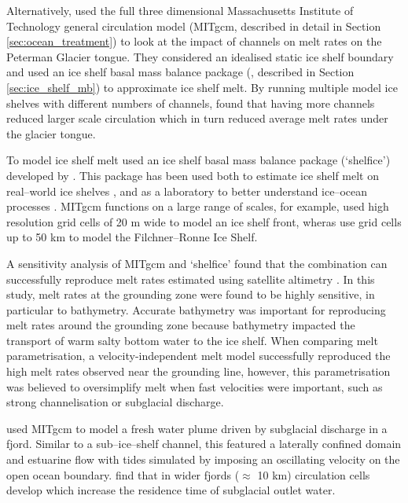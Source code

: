 Alternatively, \cite{millgate2013effect} used the full three dimensional Massachusetts Institute of Technology general circulation model (MITgcm, described in detail in Section \ref{sec:ocean_treatment}) to look at the impact of channels on melt rates on the Peterman Glacier tongue. They considered an idealised static ice shelf boundary and used an ice shelf basal mass balance package (\cite{losch2008modeling}, described in Section \ref{sec:ice_shelf_mb}) to approximate ice shelf melt. By running multiple model ice shelves with different numbers of channels, \citeauthor{millgate2013effect} found that having more channels reduced larger scale circulation which in turn reduced average melt rates under the glacier tongue.

To model ice shelf melt \cite{millgate2013effect} used an ice shelf basal mass balance package (`shelfice') developed by \cite{losch2008modeling}. This package has been used both to estimate ice shelf melt on real--world ice shelves \citep[e.g.][]{goldberg2019accurately}, and as a laboratory to better understand ice--ocean processes \citep[e.g.][]{xu2012numerical}. MITgcm functions on a large range of scales, for example, \cite{xu2012numerical} used high resolution grid cells of 20 m wide to model an ice shelf front, wheras \cite{naughten2021two} use grid cells up to 50 km to model the Filchner–Ronne Ice Shelf. 

A sensitivity analysis of MITgcm and `shelfice' found that the combination can successfully reproduce melt rates estimated using satellite altimetry \citep{goldberg2019accurately}. In this study, melt rates at the grounding zone were found to be highly sensitive, in particular to bathymetry. Accurate bathymetry was important for reproducing melt rates around the grounding zone because bathymetry impacted the transport of warm salty bottom water to the ice shelf. When comparing melt parametrisation, a velocity-independent melt model successfully reproduced the high melt rates observed near the grounding line, however, this parametrisation was believed to oversimplify melt when fast velocities were important, such as strong channelisation or subglacial discharge.


\cite{carroll2017subglacial} used MITgcm to model a fresh water plume driven by subglacial discharge in a fjord.  Similar to a sub--ice--shelf channel, this featured a laterally confined domain and estuarine flow with tides simulated by imposing an oscillating velocity on the open ocean boundary. \cite{carroll2017subglacial} find that in wider fjords ($\approx$ 10 km) circulation cells develop which increase the residence time of subglacial outlet water. 

